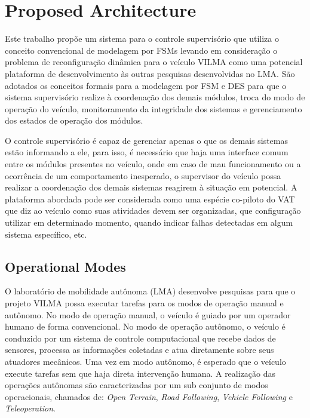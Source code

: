\documentclass[conference]{IEEEtran}
\begin{document}
\section{Proposed Architecture}\label{sec:proposed_architec}

Este trabalho propõe um sistema para o controle supervisório que utiliza o conceito convencional de modelagem por FSMs levando em consideração o problema de reconfiguração dinâmica para o veículo VILMA como uma potencial plataforma de desenvolvimento às outras pesquisas desenvolvidas no LMA. São adotados os conceitos formais para a modelagem por FSM e DES para que o sistema supervisório realize à coordenação dos demais módulos, troca do modo de operação do veículo, monitoramento da integridade dos sistemas e gerenciamento dos estados de operação dos módulos. 

O controle supervisório é capaz de gerenciar apenas o que os demais sistemas estão informando a ele, para isso, é necessário que haja  uma interface comum entre os módulos presentes no veículo, onde em caso de mau funcionamento ou a ocorrência de um comportamento inesperado, o supervisor do veículo possa realizar a coordenação dos demais sistemas reagirem à situação em potencial. A plataforma abordada pode ser considerada como uma espécie co-piloto do VAT que diz ao veículo como suas atividades devem ser organizadas, que configuração utilizar em determinado momento, quando indicar falhas detectadas em algum sistema específico, etc.  

%
\subsection{Operational Modes}\label{subsec:operational_modes}
O laboratório de mobilidade autônoma (LMA) desenvolve pesquisas para que o projeto VILMA possa executar tarefas para os modos de operação manual e autônomo. No modo de operação manual, o veículo é guiado por um operador humano de forma convencional. No modo de operação autônomo, o veículo é conduzido por um sistema de controle computacional que recebe dados de sensores, processa as informações coletadas e atua diretamente sobre seus atuadores mecânicos. Uma vez em modo autônomo, é esperado que o veículo execute tarefas sem que haja direta intervenção humana. A realização das operações autônomas são caracterizadas por um sub conjunto de modos operacionais, chamados de: \textit{Open Terrain}, \textit{Road Following}, \textit{Vehicle Following} e \textit{Teleoperation}.
\end{document}
